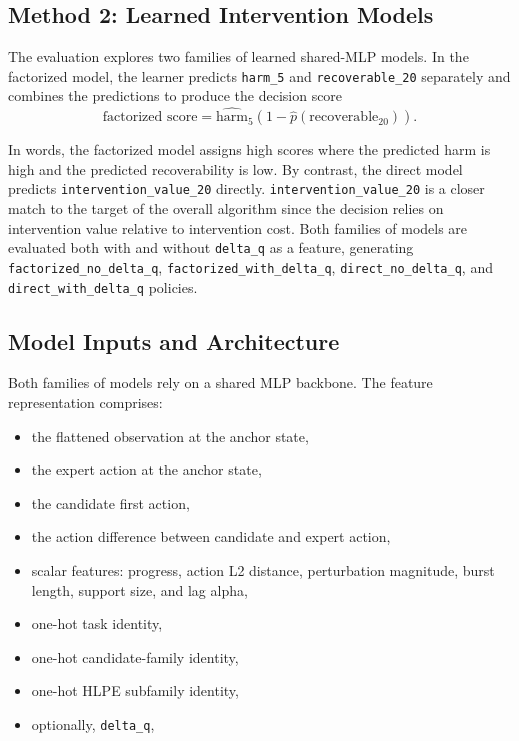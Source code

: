 \documentclass[11pt]{article}
\begin{document}
\subsection*{Method 2: Learned Intervention Models}

The evaluation explores two families of learned shared-MLP models. In the factorized model, the learner predicts \texttt{harm\_5} and \texttt{recoverable\_20} separately and combines the predictions to produce the decision score
\[
\text{factorized score} = \widehat{\text{harm}}_5 \left(1 - \hat{p}(\text{recoverable}_{20})\right).
\]

In words, the factorized model assigns high scores where the predicted harm is high and the predicted recoverability is low. By contrast, the direct model predicts \texttt{intervention\_value\_20} directly. \texttt{intervention\_value\_20} is a closer match to the target of the overall algorithm since the decision relies on intervention value relative to intervention cost. Both families of models are evaluated both with and without \texttt{delta\_q} as a feature, generating \texttt{factorized\_no\_delta\_q}, \texttt{factorized\_with\_delta\_q}, \texttt{direct\_no\_delta\_q}, and \texttt{direct\_with\_delta\_q} policies.

\subsection*{Model Inputs and Architecture}

Both families of models rely on a shared MLP backbone. The feature representation comprises:

\begin{itemize}
\item the flattened observation at the anchor state,
\item the expert action at the anchor state,
\item the candidate first action,
\item the action difference between candidate and expert action,
\item scalar features: progress, action L2 distance, perturbation magnitude, burst length, support size, and lag alpha,
\item one-hot task identity,
\item one-hot candidate-family identity,
\item one-hot HLPE subfamily identity,
\item optionally, \texttt{delta\_q},
\end{itemize}
\end{document}
